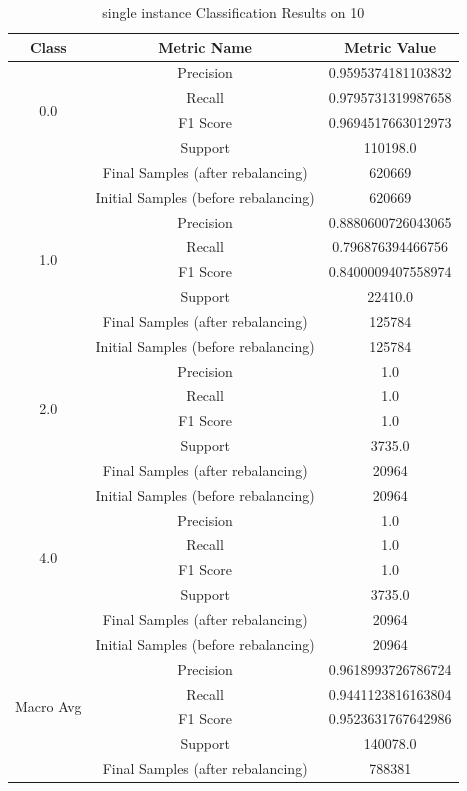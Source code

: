 \begin{longtable}{|c|c|c|}
\caption{single instance Classification Results on 10} \label{tab:10_single_instance_classifiers_results} \\
\hline
Class & Metric Name & Metric Value \\
\hline
\multirow{4}{*}{0.0} & Precision & 0.9595374181103832 \\
 & Recall & 0.9795731319987658 \\
 & F1 Score & 0.9694517663012973 \\
 & Support & 110198.0 \\
 & Final Samples (after rebalancing) & 620669 \\
 & Initial Samples (before rebalancing) & 620669 \\
\hline
\multirow{4}{*}{1.0} & Precision & 0.8880600726043065 \\
 & Recall & 0.796876394466756 \\
 & F1 Score & 0.8400009407558974 \\
 & Support & 22410.0 \\
 & Final Samples (after rebalancing) & 125784 \\
 & Initial Samples (before rebalancing) & 125784 \\
\hline
\multirow{4}{*}{2.0} & Precision & 1.0 \\
 & Recall & 1.0 \\
 & F1 Score & 1.0 \\
 & Support & 3735.0 \\
 & Final Samples (after rebalancing) & 20964 \\
 & Initial Samples (before rebalancing) & 20964 \\
\hline
\multirow{4}{*}{4.0} & Precision & 1.0 \\
 & Recall & 1.0 \\
 & F1 Score & 1.0 \\
 & Support & 3735.0 \\
 & Final Samples (after rebalancing) & 20964 \\
 & Initial Samples (before rebalancing) & 20964 \\
\hline
\multirow{4}{*}{Macro Avg} & Precision & 0.9618993726786724 \\
 & Recall & 0.9441123816163804 \\
 & F1 Score & 0.9523631767642986 \\
 & Support & 140078.0 \\
 & Final Samples (after rebalancing) & 788381 \\

\end{longtable}
